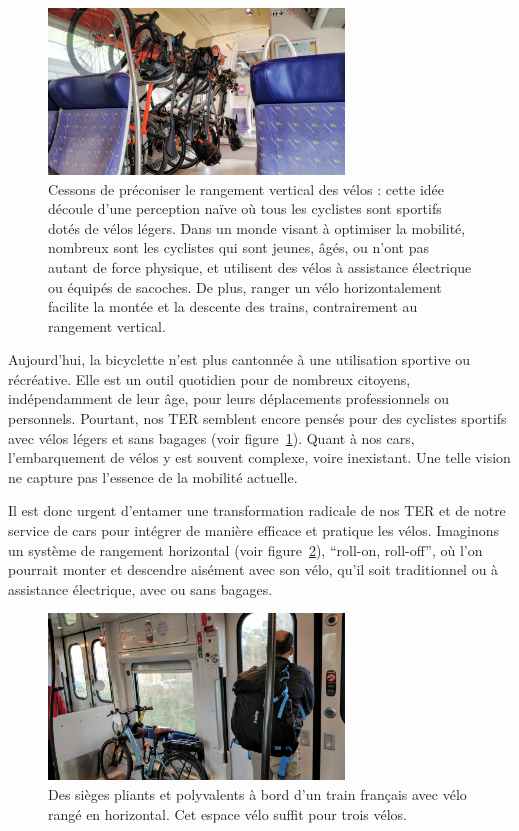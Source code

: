 \begin{figure}[ht]
  \centering
  \includegraphics[width=0.7\textwidth]{images/IMG-20220729-WA0001-TER-hanging.jpeg}
  \caption{Cessons de préconiser le rangement vertical des vélos :
    cette idée découle d'une perception naïve où tous les cyclistes
    sont sportifs dotés de vélos légers. Dans un monde visant à
    optimiser la mobilité, nombreux sont les cyclistes qui sont
    jeunes, âgés, ou n'ont pas autant de force physique, et utilisent
    des vélos à assistance électrique ou équipés de sacoches.  De
    plus, ranger un vélo horizontalement facilite la montée et la
    descente des trains, contrairement au rangement vertical.}
  \label{fig:train-velo-vertical}
\end{figure}

Aujourd'hui, la bicyclette n'est plus cantonnée à une utilisation
sportive ou récréative. Elle est un outil quotidien pour de nombreux
citoyens, indépendamment de leur âge, pour leurs déplacements
professionnels ou personnels. Pourtant, nos TER semblent encore pensés
pour des cyclistes sportifs avec vélos légers et sans bagages (voir
figure~\ref{fig:train-velo-vertical}). Quant à nos cars,
l'embarquement de vélos y est souvent complexe, voire inexistant. Une
telle vision ne capture pas l'essence de la mobilité actuelle.

Il est donc urgent d'entamer une transformation radicale de nos TER et
de notre service de cars pour intégrer de manière efficace et pratique
les vélos. Imaginons un système de rangement horizontal (voir
figure~\ref{fig:train-velo-francais-horizontal}), ``roll-on,
roll-off'', où l'on pourrait monter et descendre aisément avec son
vélo, qu'il soit traditionnel ou à assistance électrique, avec ou sans
bagages.

\begin{figure}[ht]
  \centering
  \includegraphics[width=0.7\textwidth]{images/IMG_20221223_145849-TER-horizontal.jpg}
  \caption{Des sièges pliants et polyvalents à bord d'un train
    français avec vélo rangé en horizontal.  Cet espace vélo suffit
    pour trois vélos.}
  \label{fig:train-velo-francais-horizontal}
\end{figure}

